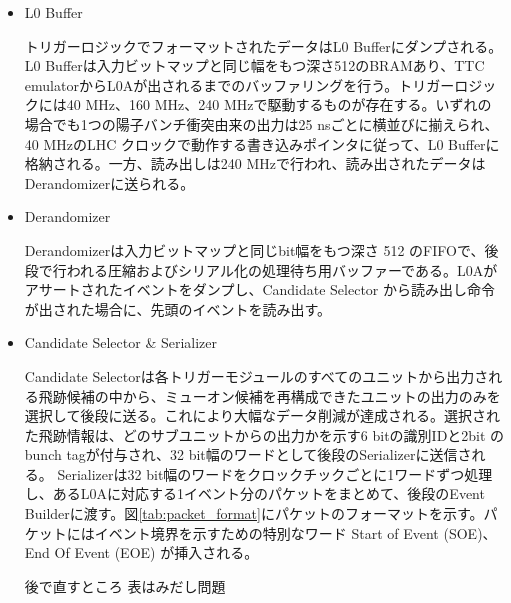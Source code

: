 \begin{itemize}
    \item L0 Buffer　　
    \par
    トリガーロジックでフォーマットされたデータはL0 Bufferにダンプされる。L0 Bufferは入力ビットマップと同じ幅をもつ深さ512のBRAMあり、TTC emulatorからL0Aが出されるまでのバッファリングを行う。トリガーロジックには40 MHz、160 MHz、240 MHzで駆動するものが存在する。いずれの場合でも1つの陽子バンチ衝突由来の出力は25 nsごとに横並びに揃えられ、40 MHzのLHC クロックで動作する書き込みポインタに従って、L0 Bufferに格納される。一方、読み出しは240 MHzで行われ、読み出されたデータはDerandomizerに送られる。

    \item Derandomizer　　
    \par
    Derandomizerは入力ビットマップと同じbit幅をもつ深さ 512 のFIFOで、後段で行われる圧縮およびシリアル化の処理待ち用バッファーである。L0Aがアサートされたイベントをダンプし、Candidate Selector から読み出し命令が出された場合に、先頭のイベントを読み出す。

    \item Candidate Selector \& Serializer　　
    \par
    Candidate Selectorは各トリガーモジュールのすべてのユニットから出力される飛跡候補の中から、ミューオン候補を再構成できたユニットの出力のみを選択して後段に送る。これにより大幅なデータ削減が達成される。選択された飛跡情報は、どのサブユニットからの出力かを示す6 bitの識別IDと2bit のbunch tagが付与され、32 bit幅のワードとして後段のSerializerに送信される。
    Serializerは32 bit幅のワードをクロックチックごとに1ワードずつ処理し、あるL0Aに対応する1イベント分のパケットをまとめて、後段のEvent Builderに渡す。図\ref{tab:packet_format}にパケットのフォーマットを示す。パケットにはイベント境界を示すための特別なワード Start of Event (SOE)、End Of Event (EOE) が挿入される。

\begin{itembox}{後で直すところ}
    表はみだし問題
\end{itembox}


\end{itemize}
